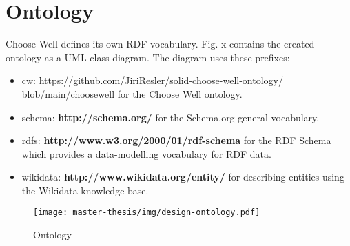 \section{Ontology}
Choose Well defines its own RDF vocabulary. 
Fig. x contains the created ontology as a UML class diagram. 
The diagram uses these prefixes:
\begin{itemize}[noitemsep,nolistsep]
  \item cw: https://github.com/JiriResler/solid-choose-well-ontology/ \newline blob/main/choosewell for the Choose Well ontology.
  \item schema: \textbf{http://schema.org/} for the Schema.org general vocabulary. 
  \item rdfs: \textbf{http://www.w3.org/2000/01/rdf-schema} for the RDF Schema which provides a data-modelling vocabulary for RDF data.
  \item wikidata: \textbf{http://www.wikidata.org/entity/} for describing entities using the Wikidata knowledge base.
\end{itemize}

\begin{figure}[h]
  \centering
  \texttt{[image: master-thesis/img/design-ontology.pdf]}
  \caption{Ontology}
\end{figure}